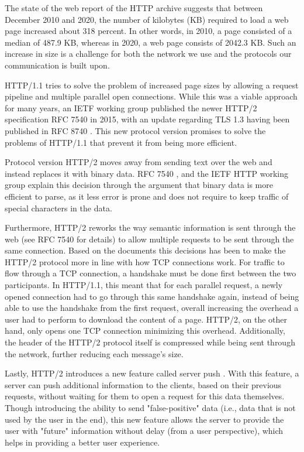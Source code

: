 \documentclass[conference]{IEEEtran}
\begin{document}
The state of the web report of the HTTP archive \cite{httpArchive} suggests that between December 2010 and 2020, the number of kilobytes (KB) required to load a web page increased about 318 percent. In other words, in 2010, a page consisted of a median of 487.9 KB, whereas in 2020, a web page consists of 2042.3 KB. Such an increase in size is a challenge for both the network we use and the protocols our communication is built upon.

HTTP/1.1 tries to solve the problem of increased page sizes by allowing a request pipeline and multiple parallel open connections. While this was a viable approach for many years, an IETF working group published the newer HTTP/2 specification RFC 7540 \cite{rfc7540} in 2015, with an update regarding TLS 1.3 having been published in RFC 8740 \cite{rfc8740}. This new protocol version promises to solve the problems of HTTP/1.1 that prevent it from being more efficient.

Protocol version HTTP/2 moves away from sending text over the web and instead replaces it with binary data. RFC 7540 \cite{rfc7540}, and the IETF HTTP working group \cite{httpwgHTTP2} explain this decision through the argument that binary data is more efficient to parse, as it less error is prone and does not require to keep traffic of special characters in the data.

Furthermore, HTTP/2 reworks the way semantic information is sent through the web (see RFC 7540 \cite{rfc7540} for details) to allow multiple requests to be sent through the same connection. Based on the documents \cite{rfc7540} \cite{httpwgHTTP2} this decisions has been to make the HTTP/2 protocol more in line with how TCP connections work. For traffic to flow through a TCP connection, a handshake must be done first between the two participants. In HTTP/1.1, this meant that for each parallel request, a newly opened connection had to go through this same handshake again, instead of being able to use the handshake from the first request, overall increasing the overhead a user had to perform to download the content of a page. HTTP/2, on the other hand, only opens one TCP connection minimizing this overhead. Additionally, the header of the HTTP/2 protocol itself is compressed while being sent through the network, further reducing each message's size.

Lastly, HTTP/2 introduces a new feature called server push \cite{rfc7540}. With this feature, a server can push additional information to the clients, based on their previous requests, without waiting for them to open a request for this data themselves. Though introducing the ability to send "false-positive" data (i.e., data that is not used by the user in the end), this new feature allows the server to provide the user with "future" information without delay (from a user perspective), which helps in providing a better user experience.
\end{document}
